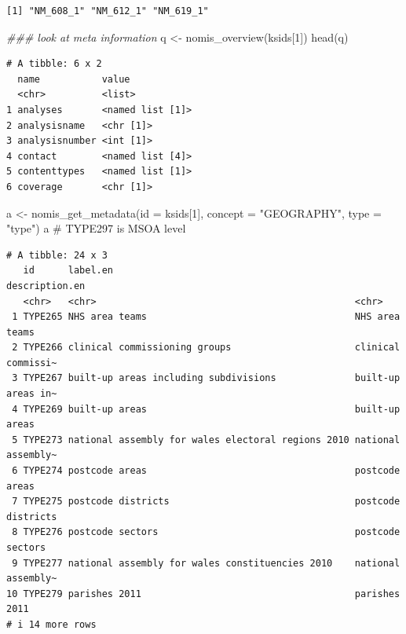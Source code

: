 \documentclass[
  letterpaper,
  DIV=11,
  numbers=noendperiod]{scrreprt}
\newenvironment{Shaded}{\begin{snugshade}}{\end{snugshade}}
\newcommand{\AttributeTok}[1]{\textcolor[rgb]{0.40,0.45,0.13}{#1}}
\newcommand{\CommentTok}[1]{\textcolor[rgb]{0.37,0.37,0.37}{#1}}
\newcommand{\DecValTok}[1]{\textcolor[rgb]{0.68,0.00,0.00}{#1}}
\newcommand{\DocumentationTok}[1]{\textcolor[rgb]{0.37,0.37,0.37}{\textit{#1}}}
\newcommand{\FunctionTok}[1]{\textcolor[rgb]{0.28,0.35,0.67}{#1}}
\newcommand{\NormalTok}[1]{\textcolor[rgb]{0.00,0.23,0.31}{#1}}
\newcommand{\OtherTok}[1]{\textcolor[rgb]{0.00,0.23,0.31}{#1}}
\newcommand{\StringTok}[1]{\textcolor[rgb]{0.13,0.47,0.30}{#1}}
\begin{document}
\begin{verbatim}
[1] "NM_608_1" "NM_612_1" "NM_619_1"
\end{verbatim}

\begin{Shaded}
\begin{Highlighting}[]
\DocumentationTok{\#\#\# look at meta information}
\NormalTok{q }\OtherTok{\textless{}{-}} \FunctionTok{nomis\_overview}\NormalTok{(ksids[}\DecValTok{1}\NormalTok{])}
\FunctionTok{head}\NormalTok{(q)}
\end{Highlighting}
\end{Shaded}

\begin{verbatim}
# A tibble: 6 x 2
  name           value           
  <chr>          <list>          
1 analyses       <named list [1]>
2 analysisname   <chr [1]>       
3 analysisnumber <int [1]>       
4 contact        <named list [4]>
5 contenttypes   <named list [1]>
6 coverage       <chr [1]>       
\end{verbatim}

\begin{Shaded}
\begin{Highlighting}[]
\NormalTok{a }\OtherTok{\textless{}{-}} \FunctionTok{nomis\_get\_metadata}\NormalTok{(}\AttributeTok{id =}\NormalTok{ ksids[}\DecValTok{1}\NormalTok{], }\AttributeTok{concept =} \StringTok{"GEOGRAPHY"}\NormalTok{, }\AttributeTok{type =} \StringTok{"type"}\NormalTok{)}
\NormalTok{a }\CommentTok{\# TYPE297 is MSOA level}
\end{Highlighting}
\end{Shaded}

\begin{verbatim}
# A tibble: 24 x 3
   id      label.en                                           description.en    
   <chr>   <chr>                                              <chr>             
 1 TYPE265 NHS area teams                                     NHS area teams    
 2 TYPE266 clinical commissioning groups                      clinical commissi~
 3 TYPE267 built-up areas including subdivisions              built-up areas in~
 4 TYPE269 built-up areas                                     built-up areas    
 5 TYPE273 national assembly for wales electoral regions 2010 national assembly~
 6 TYPE274 postcode areas                                     postcode areas    
 7 TYPE275 postcode districts                                 postcode districts
 8 TYPE276 postcode sectors                                   postcode sectors  
 9 TYPE277 national assembly for wales constituencies 2010    national assembly~
10 TYPE279 parishes 2011                                      parishes 2011     
# i 14 more rows
\end{verbatim}
\end{document}
